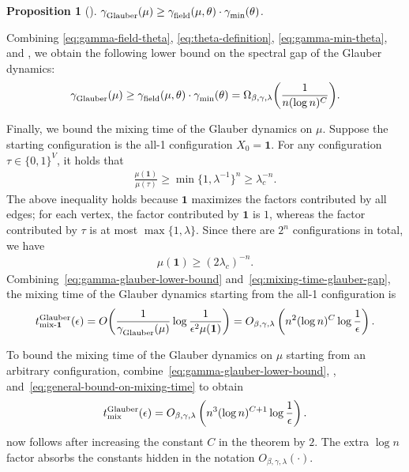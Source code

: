 \documentclass[11pt]{amsart}
\newcommand{\tp}[1]{{\left( #1 \right)}}
\newtheorem{proposition}[theorem]{Proposition}
\theoremstyle{definition}
\theoremstyle{remark}
\begin{document}
\begin{proposition}[\cite{CFYZ21}]\label{prop:gamma-glauber-field-min}
$\gamma_{\textnormal{Glauber}}^{}(\mu) \geq \gamma_{\textnormal{field}}^{}(\mu,\theta) \cdot \gamma_{\textnormal{min}}^{}(\theta)$.
\end{proposition}

Combining \eqref{eq:gamma-field-theta}, \eqref{eq:theta-definition}, \eqref{eq:gamma-min-theta}, and , we obtain the following lower bound on the spectral gap of the Glauber dynamics:
\begin{align}\label{eq:gamma-glauber-lower-bound}
    \gamma_{\textnormal{Glauber}}^{}(\mu) \geq \gamma_{\textnormal{field}}^{}(\mu,\theta) \cdot \gamma_{\textnormal{min}}^{}(\theta) = \Omega_{\beta,\gamma,\lambda} \tp{\frac{1}{n (\log n)^{C}}}.
\end{align}

Finally, we bound the mixing time of the Glauber dynamics on $\mu$.
Suppose the starting configuration is the all-1 configuration $X_0 = \boldsymbol{1}$. For any configuration $\tau \in \{0,1\}^V$, it holds that 
\begin{align*}
\frac{\mu(\boldsymbol{1})}{\mu(\tau)} \geq \min\{1,\lambda^{-1}\}^n \geq \lambda_c^{-n}.
\end{align*}
The above inequality holds because $\boldsymbol{1}$ maximizes the factors contributed by all edges; for each vertex, the factor contributed by $\boldsymbol{1}$ is $1$, whereas the factor contributed by $\tau$ is at most $\max\{1,\lambda\}$. Since there are $2^n$ configurations in total, we have
\begin{align}\label{eq:mu-1-lower-bound}
   {\mu(\boldsymbol{1})} \geq (2 \lambda_c)^{-n}.
\end{align}
Combining~\eqref{eq:gamma-glauber-lower-bound} and~\eqref{eq:mixing-time-glauber-gap}, the mixing time of the Glauber dynamics starting from the all-1 configuration is 
\begin{align*}
t^{\textnormal{Glauber}}_{\textnormal{mix-}\boldsymbol{1}}(\epsilon) = O\tp{ \frac{1}{ \gamma_{\textnormal{Glauber}}^{}(\mu) } \log \frac{1}{\epsilon^2 \mu(\boldsymbol{1})}} = O_{\beta,\gamma,\lambda}\left(n^2 (\log n)^C \log \frac{1}{\epsilon}\right).
\end{align*}

To bound the mixing time of the Glauber dynamics on $\mu$ starting from an arbitrary configuration, combine~\eqref{eq:gamma-glauber-lower-bound}, , and~\eqref{eq:general-bound-on-mixing-time} to obtain
\begin{align*}
    t^{\textnormal{Glauber}}_{\textnormal{mix}}(\epsilon) = O_{\beta,\gamma,\lambda}\left(n^3 (\log n)^{C+1} \log \frac{1}{\epsilon}\right).
\end{align*}
 now follows after increasing the constant $C$ in the theorem by $2$. The extra $\log n$ factor absorbs the constants hidden in the notation $O_{\beta,\gamma,\lambda}(\cdot)$.
\end{document}
